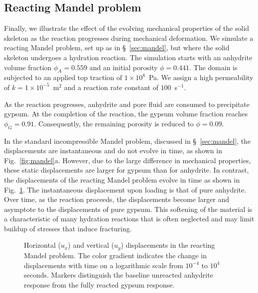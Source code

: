 \documentclass[11pt]{article}
\begin{document}
\subsection{Reacting Mandel problem}\label{sec:mandel react}

Finally, we illustrate the effect of the evolving mechanical properties of the solid skeleton as the reaction progresses during mechanical deformation. We simulate a reacting Mandel problem, set up as in \S~\ref{sec:mandel}, but where the solid skeleton undergoes a hydration reaction. The simulation starts with an anhydrite volume fraction $\phi_A = 0.559$ and an initial porosity $\phi = 0.441$. The domain is subjected to an applied top traction of $1 \times 10^{8}$~Pa. We assign a high permeability of $k = 1 \times 10^{-5}$~m$^2$ and a reaction rate constant of $100$~s$^{-1}$.

As the reaction progresses, anhydrite and pore fluid are consumed to precipitate gypsum. At the completion of the reaction, the gypsum volume fraction reaches $\phi_G = 0.91$. Consequently, the remaining porosity is reduced to $\phi = 0.09$. 

In the standard incompressible Mandel problem, discussed in \S~\ref{sec:mandel}, the displacements are instantaneous and do not evolve in time, as shown in Fig.~\ref{fig:mandel}a. However, due to the large difference in mechanical properties, these static displacements are larger for gypsum than for anhydrite. In contrast, the displacements of the reacting Mandel problem evolve in time as shown in Fig.~\ref{fig:reacting_mandel_spatial}. The instantaneous displacement upon loading is that of pure anhydrite. Over time, as the reaction proceeds, the displacements become larger and asymptote to the displacements of pure gypsum. This softening of the material is a characteristic of many hydration reactions that is often neglected and may limit buildup of stresses that induce fracturing.


\begin{figure}[htbp]
    \centering
    \resizebox{0.7\textwidth}{!}{}
    \caption{Horizontal ($u_x$) and vertical ($u_y$) displacements in the reacting Mandel problem. The color gradient indicates the change in displacements with time on a logarithmic scale from $10^{-4}$ to $10^{4}$ seconds. Markers distinguish the baseline unreacted anhydrite response from the fully reacted gypsum response.}
    \label{fig:reacting_mandel_spatial}
\end{figure}
\end{document}
